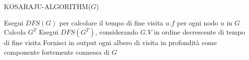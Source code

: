\begin{algorithm}[H] 
    \caption{KOSARAJU-ALGORITHM($G$)}\label{alg:cap2}
    \begin{algorithmic}[1]
        \State Esegui $DFS(G)$ per calcolare il tempo di fine visita $u.f$ per ogni nodo $u$ in $G$
        \State Calcola $G^T$
        \State Esegui $DFS(G^T)$, considerando $G.V$ in ordine decrescente di tempo di fine visita
        \State Fornisci in output ogni albero di visita in profondit\`a come componente fortemente connessa di $G$
    \end{algorithmic}
\end{algorithm}